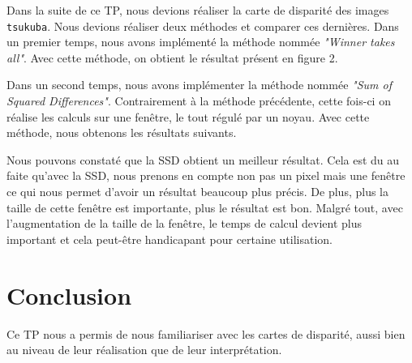 \documentclass[12pt]{report}
\begin{document}
Dans la suite de ce TP, nous devions réaliser la carte de disparité des images \texttt{tsukuba}. Nous devions réaliser deux méthodes et comparer ces dernières. Dans un premier temps, nous avons implémenté la méthode nommée \textit{"Winner takes all"}. Avec cette méthode, on obtient le résultat présent en figure 2.

Dans un second temps, nous avons implémenter la méthode nommée \textit{"Sum of Squared Differences"}. Contrairement à la méthode précédente, cette fois-ci on réalise les calculs sur une fenêtre, le tout régulé par un noyau. Avec cette méthode, nous obtenons les résultats suivants.

Nous pouvons constaté que la SSD obtient un meilleur résultat. Cela est du au faite qu'avec la SSD, nous prenons en compte non pas un pixel mais une fenêtre ce qui nous permet d'avoir un résultat beaucoup plus précis. De plus, plus la taille de cette fenêtre est importante, plus le résultat est bon. Malgré tout, avec l'augmentation de la taille de la fenêtre, le temps de calcul devient plus important et  cela peut-être handicapant pour certaine utilisation.

\section{Conclusion}
 
 Ce TP nous a permis de nous familiariser avec les cartes de disparité, aussi bien au niveau de leur réalisation que de leur interprétation. 

\newpage



\renewcommand*\listfigurename{\large Liste des figures}
\listoffigures
\newpage
\end{document}

